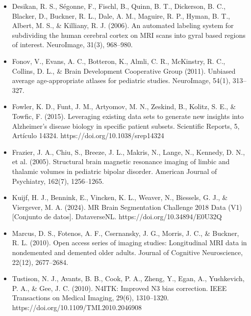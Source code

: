 \documentclass[10pt]{article}
\begin{document}
\begin{itemize}
    \item Desikan, R. S., Ségonne, F., Fischl, B., Quinn, B. T., Dickerson, B. C., Blacker, D., Buckner, R. L., Dale, A. M., Maguire, R. P., Hyman, B. T., Albert, M. S., \& Killiany, R. J. (2006). An automated labeling system for subdividing the human cerebral cortex on MRI scans into gyral based regions of interest. NeuroImage, 31(3), 968--980.
    \item Fonov, V., Evans, A. C., Botteron, K., Almli, C. R., McKinstry, R. C., Collins, D. L., \& Brain Development Cooperative Group (2011). Unbiased average age-appropriate atlases for pediatric studies. NeuroImage, 54(1), 313--327.
    \item Fowler, K. D., Funt, J. M., Artyomov, M. N., Zeskind, B., Kolitz, S. E., \& Towfic, F. (2015). Leveraging existing data sets to generate new insights into Alzheimer's disease biology in specific patient subsets. Scientific Reports, 5, Artículo 14324. https://doi.org/10.1038/srep14324
    \item Frazier, J. A., Chiu, S., Breeze, J. L., Makris, N., Lange, N., Kennedy, D. N., et al. (2005). Structural brain magnetic resonance imaging of limbic and thalamic volumes in pediatric bipolar disorder. American Journal of Psychiatry, 162(7), 1256--1265.
    \item Kuijf, H. J., Bennink, E., Vincken, K. L., Weaver, N., Biessels, G. J., \& Viergever, M. A. (2024). MR Brain Segmentation Challenge 2018 Data (V1) [Conjunto de datos]. DataverseNL. https://doi.org/10.34894/E0U32Q
    \item Marcus, D. S., Fotenos, A. F., Csernansky, J. G., Morris, J. C., \& Buckner, R. L. (2010). Open access series of imaging studies: Longitudinal MRI data in nondemented and demented older adults. Journal of Cognitive Neuroscience, 22(12), 2677--2684.
    \item Tustison, N. J., Avants, B. B., Cook, P. A., Zheng, Y., Egan, A., Yushkevich, P. A., \& Gee, J. C. (2010). N4ITK: Improved N3 bias correction. IEEE Transactions on Medical Imaging, 29(6), 1310--1320. https://doi.org/10.1109/TMI.2010.2046908
\end{itemize}
\end{document}
